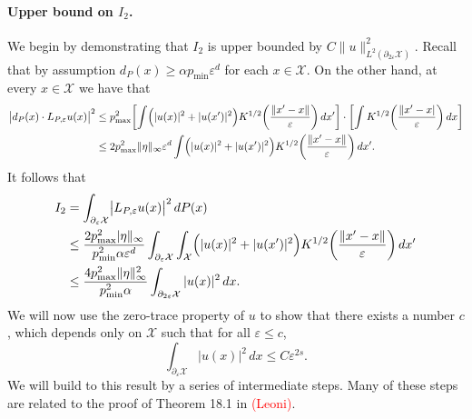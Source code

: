 \documentclass{article}
\newcommand{\1}{\mathbf{1}}
\newcommand{\Leb}{L}
\newcommand{\mc}[1]{\mathcal{#1}}
\theoremstyle{definition}
\theoremstyle{remark}
\begin{document}
\paragraph{Upper bound on $I_2$.}
We begin by demonstrating that $I_2$ is upper bounded by $C\|u\|_{\Leb^2(\partial_{2\varepsilon}\mc{X})}^2$. Recall that by assumption $d_P(x) \geq \alpha p_{\min} \varepsilon^d$ for each $x \in \mc{X}$. On the other hand, at every $x \in \mc{X}$ we have that
\begin{align*}
\bigl|d_P(x) \cdot L_{P,\varepsilon}u(x)\bigr|^2 & \leq p_{\max}^2 \biggl[\int \Bigl(|u(x)|^2 + |u(x')|^2\Bigr) K^{1/2}\biggl(\frac{\|x' - x\|}{\varepsilon}\biggr) \,dx'\biggr] \cdot \biggl[\int K^{1/2}\biggl(\frac{\|x' - x|}{\varepsilon}\biggr) \,dx\biggr] \\
& \leq 2 p_{\max}^2 \|\eta\|_{\infty} \varepsilon^d \int \Bigl(|u(x)|^2 + |u(x')|^2\Bigr) K^{1/2}\biggl(\frac{\|x' - x\|}{\varepsilon}\biggr) \,dx'.
\end{align*}
It follows that
\begin{align*}
I_2 & = \int_{\partial_{\varepsilon}\mc{X}} \bigl|L_{P,\varepsilon}u(x)\bigr|^2 \,dP(x) \\
& \leq \frac{2p_{\max}^2 |\eta\|_{\infty}}{p_{\min}^2 \alpha \varepsilon^d} \int_{\partial_{\varepsilon}\mc{X}} \int_{\mc{X}} \Bigl(|u(x)|^2 + |u(x')|^2\Bigr) K^{1/2}\biggl(\frac{\|x' - x\|}{\varepsilon}\biggr) \,dx' \\ 
& \leq \frac{4p_{\max}^2 \|\eta\|_{\infty}^2}{p_{\min}^2 \alpha} \int_{\partial_{2\varepsilon}\mc{X}} |u(x)|^2 \,dx.
\end{align*}
We will now use the zero-trace property of $u$ to show that there exists a number $c$, which depends only on $\mc{X}$ such that for all $\varepsilon \leq c$,
\begin{equation}
\label{pf:kernel_smoothing_bias_5}
\int_{\partial_{\varepsilon}\mc{X}} |u(x)|^2 \,dx \leq C\varepsilon^{2s}.
\end{equation}
We will build to this result by a series of intermediate steps. Many of these steps are related to the proof of Theorem 18.1 in \textcolor{red}{(Leoni)}. 
\end{document}
